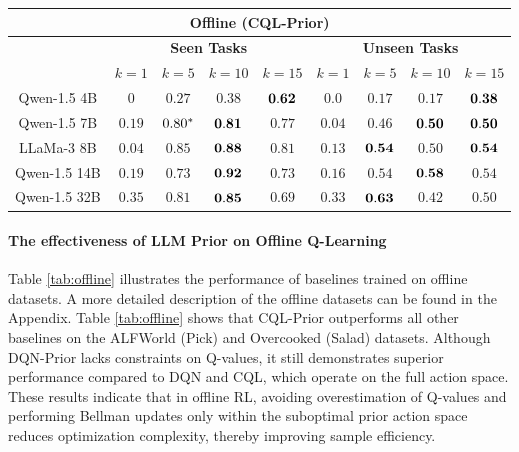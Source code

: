 \documentclass{article} %
\theoremstyle{plain}
\theoremstyle{definition}
\theoremstyle{remark}
\begin{document}
{\begin{table}[]
\begin{tabular}{c|cccc|cccc}
         

         \hline
    \multicolumn{9}{c}{\textbf{Offline (CQL-Prior)}}\\
    \hline
    \hline
         & \multicolumn{4}{c|}{\textbf{Seen Tasks}} & \multicolumn{4}{c}{\textbf{Unseen Tasks}} \\
        \hline
        \hline
        & $k=1$&$k=5$ &$k=10$&$k=15$&$k=1$&$k=5$&$k=10$&$k=15$\\
         \hline
         Qwen-1.5 4B&$0$&$0.27$&$0.38$&$\bf0.62$&$0.0$&$0.17$&$0.17$&$\bf 0.38$\\
         Qwen-1.5 7B&$0.19$&$0.80^{\bf{*}}$& $\bf0.81$&$0.77$&$0.04$&$0.46$&$\bf 0.50$&$\bf 0.50$\\
         LLaMa-3 8B &$0.04$&$0.85$&$\bf0.88$&$0.81$&$0.13$&$\bf 0.54$&$0.50$&$\bf 0.54$\\
         Qwen-1.5 14B&$0.19$&$0.73$& $\bf0.92$&$0.73$&$0.16$&$0.54$&$\bf 0.58$&$0.54$\\
         Qwen-1.5 32B&$0.35$&$0.81$&$\bf0.85$&$0.69$&$0.33$&$\bf  0.63$&$0.42$&$0.50$\\
         
         

         \hline

    \end{tabular}
    \label{tab:generalize}
\end{table}
\paragraph{The effectiveness of LLM Prior on Offline Q-Learning} Table \ref{tab:offline} illustrates the performance of baselines trained on offline datasets. A more detailed description of the offline datasets can be found in the Appendix. Table \ref{tab:offline} shows that CQL-Prior outperforms all other baselines on the ALFWorld (Pick) and Overcooked (Salad) datasets. Although DQN-Prior lacks constraints on Q-values, it still demonstrates superior performance compared to DQN and CQL, which operate on the full action space. These results indicate that in offline RL, avoiding overestimation of Q-values and performing Bellman updates only within the suboptimal prior action space reduces optimization complexity, thereby improving sample efficiency.

}
\end{document}
